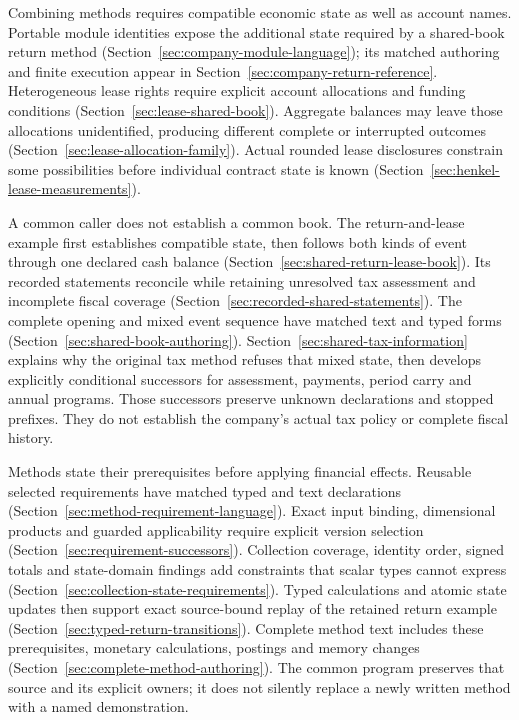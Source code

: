 Combining methods requires compatible economic state as well as account names.
Portable module identities expose the additional state required by a
shared-book return method (Section~\ref{sec:company-module-language});
its matched authoring and finite execution appear in
Section~\ref{sec:company-return-reference}. Heterogeneous lease rights require
explicit account allocations and funding conditions
(Section~\ref{sec:lease-shared-book}). Aggregate balances may leave those
allocations unidentified, producing different complete or interrupted
outcomes (Section~\ref{sec:lease-allocation-family}).
Actual rounded lease disclosures constrain some possibilities before
individual contract state is known
(Section~\ref{sec:henkel-lease-measurements}).

A common caller does not establish a common book. The return-and-lease example
first establishes compatible state, then follows both kinds of event through
one declared cash balance (Section~\ref{sec:shared-return-lease-book}).
Its recorded statements reconcile while retaining unresolved tax assessment
and incomplete fiscal coverage
(Section~\ref{sec:recorded-shared-statements}). The complete opening and
mixed event sequence have matched text and typed forms
(Section~\ref{sec:shared-book-authoring}).
Section~\ref{sec:shared-tax-information} explains why the original tax
method refuses that mixed state, then develops explicitly conditional
successors for assessment, payments, period carry and annual programs.
Those successors preserve unknown declarations and stopped prefixes. They
do not establish the company's actual tax policy or complete fiscal history.

Methods state their prerequisites before applying financial effects.
Reusable selected requirements have matched typed and text declarations
(Section~\ref{sec:method-requirement-language}).
Exact input binding, dimensional products and guarded applicability require
explicit version selection (Section~\ref{sec:requirement-successors}).
Collection coverage, identity order, signed totals and state-domain findings
add constraints that scalar types cannot express
(Section~\ref{sec:collection-state-requirements}).
Typed calculations and atomic state updates then support exact source-bound
replay of the retained return example
(Section~\ref{sec:typed-return-transitions}).
Complete method text includes these prerequisites, monetary calculations,
postings and memory changes
(Section~\ref{sec:complete-method-authoring}).
The common program preserves that source and its explicit owners; it does
not silently replace a newly written method with a named demonstration.

